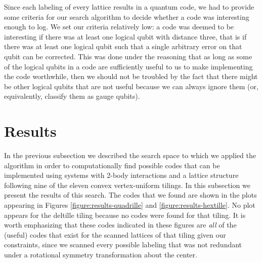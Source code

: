 \documentclass{amsbook}
\theoremstyle{plain}
\theoremstyle{definition}
\theoremstyle{remark}
\begin{document}
Since each labeling of every lattice results in a quantum code, we had to provide some criteria for our search algorithm to decide whether a code was interesting enough to log.  We set our criteria relatively low:  a code was deemed to be interesting if there was at least one logical qubit with distance three, that is if there was at least one logical qubit such that a single arbitrary error on that qubit can be corrected.  This was done under the reasoning that as long as some of the logical qubits in a code are sufficiently useful to us to make implementing the code worthwhile, then we should not be troubled by the fact that there might be other logical qubits that are not useful because we can always ignore them (or, equivalently, classify them as gauge qubits).
\section{Results} \label{sec:results}

In the previous subsection we described the search space to which we applied the algorithm in order to computationally find possible codes that can be implemented using systems with 2-body interactions and a lattice structure following nine of the eleven convex vertex-uniform tilings.  In this subsection we present the results of this search.  The codes that we found are shown in the plots appearing in Figures \ref{figure:results-quadrille} and \ref{figure:results-hextille}.  No plot appears for the deltille tiling because no codes were found for that tiling.  It is worth emphasizing that these codes indicated in these figures are \emph{all} of the (useful) codes that exist for the scanned lattices of that tiling given our constraints, since we scanned every possible labeling that was not redundant under a rotational symmetry transformation about the center.
\end{document}
